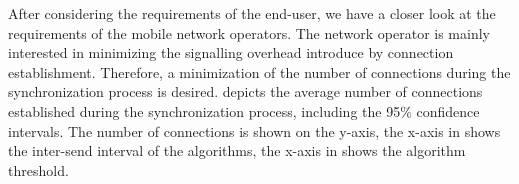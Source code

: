 After considering the requirements of the end-user, we have a closer look at the requirements of the mobile network operators.
The network operator is mainly interested in minimizing the signalling overhead introduce by connection establishment.
Therefore, a minimization of the number of connections during the synchronization process is desired.
 depicts the average number of connections \connectionCount established during the synchronization process, including the 95\% confidence intervals.
The number of connections is shown on the y-axis, the x-axis in  shows the inter-send interval of the \algointerval algorithms, the x-axis in  shows the \algosize algorithm threshold.

